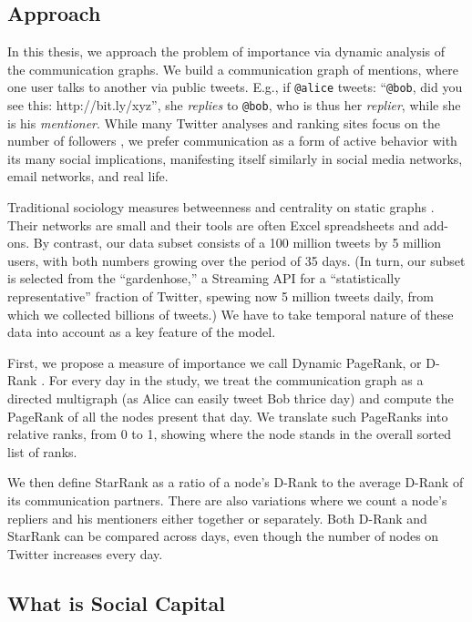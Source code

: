 \documentclass[10pt,oneside]{memoir}
\begin{document}
\subsection{Approach}
\label{approach}

In this thesis, we approach the problem of importance via dynamic analysis of the communication graphs. We build a communication graph of mentions, where one user talks to another via public tweets. E.g., if \texttt{@alice} tweets: ``\texttt{@bob}, did you see this: http://bit.ly/xyz'', she {\itshape replies} to \texttt{@bob}, who is thus her {\itshape replier}, while she is his {\itshape mentioner}. While many Twitter analyses and ranking sites focus on the number of followers \cite{DBLP:conf/kdd/JavaSFT07}, we prefer communication as a form of active behavior with its many social implications, manifesting itself similarly in social media networks, email networks, and real life.


Traditional sociology measures betweenness and centrality on static graphs \cite{bonacich1987power}. Their networks are small and their tools are often Excel spreadsheets and add-ons. By contrast, our data subset consists of a 100 million tweets by 5 million users, with both numbers growing over the period of 35 days. (In turn, our subset is selected from the ``gardenhose,'' a Streaming API for a ``statistically representative'' fraction of Twitter, spewing now 5 million tweets daily, from which we collected billions of tweets.) We have to take temporal nature of these data into account as a key feature of the model.


First, we propose a measure of importance we call Dynamic PageRank, or D-Rank \cite{Khrabrov:2010:Dynamic}. For every day in the study, we treat the communication graph as a directed multigraph (as Alice can easily tweet Bob thrice day) and compute the PageRank of all the nodes present that day. We translate such PageRanks into relative ranks, from 0 to 1, showing where the node stands in the overall sorted list of ranks.


We then define StarRank as a ratio of a node's D-Rank to the average D-Rank of its communication partners. There are also variations where we count a node's repliers and his mentioners either together or separately. Both D-Rank and StarRank can be compared across days, even though the number of nodes on Twitter increases every day.


\pagebreak \subsection{What is Social Capital}
\label{whatissocialcapital}
\end{document}

